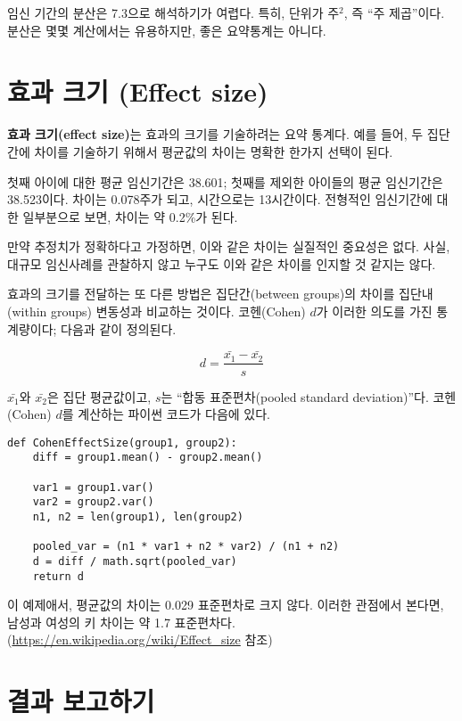 임신 기간의 분산은 7.3으로 해석하기가 여렵다. 특히, 단위가 주$^2$, 즉 ``주 제곱''이다.
분산은 몇몇 계산에서는 유용하지만, 좋은 요약통계는 아니다.


\section{효과 크기 (Effect size)}

{\bf 효과 크기(effect size)}는 효과의 크기를 기술하려는 요약 통계다. 예를 들어,
두 집단간에 차이를 기술하기 위해서 평균값의 차이는 명확한 한가지 선택이 된다.

첫째 아이에 대한 평균 임신기간은 38.601; 첫째를 제외한 아이들의 평균 임신기간은 38.523이다. 
차이는 0.078주가 되고, 시간으로는 13시간이다. 전형적인 임신기간에 대한 일부분으로 보면, 차이는 약 0.2\%가 된다.

만약 추정치가 정확하다고 가정하면, 이와 같은 차이는 실질적인 중요성은 없다.
사실, 대규모 임신사례를 관찰하지 않고 누구도 이와 같은 차이를 인지할 것 같지는 않다.

효과의 크기를 전달하는 또 다른 방법은 집단간(between groups)의 차이를 집단내(within groups) 변동성과 비교하는 것이다. 코헨(Cohen) $d$가 이러한 의도를 가진 통계량이다; 다음과 같이 정의된다.

%
\[ d = \frac{\bar{x_1} - \bar{x_2}}{s}  \]
%

$\bar{x_1}$와 $\bar{x_2}$은 집단 평균값이고, $s$는 ``합동 표준편차(pooled standard deviation)''다.
코헨(Cohen) $d$를 계산하는 파이썬 코드가 다음에 있다.


\begin{verbatim}
def CohenEffectSize(group1, group2):
    diff = group1.mean() - group2.mean()

    var1 = group1.var()
    var2 = group2.var()
    n1, n2 = len(group1), len(group2)

    pooled_var = (n1 * var1 + n2 * var2) / (n1 + n2)
    d = diff / math.sqrt(pooled_var)
    return d
\end{verbatim}

이 예제애서, 평균값의 차이는 0.029 표준편차로 크지 않다. 이러한 관점에서 본다면,
남성과 여성의 키 차이는 약 1.7 표준편차다.(\url{https://en.wikipedia.org/wiki/Effect_size} 참조)


\section{결과 보고하기}


